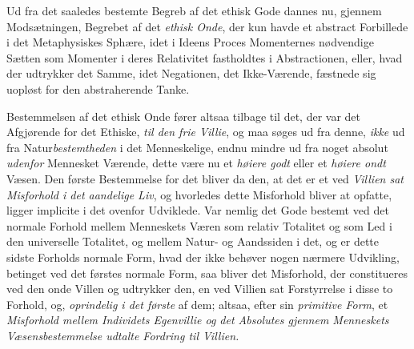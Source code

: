 Ud fra det saaledes bestemte Begreb af det ethisk Gode dannes nu, gjennem
Modsætningen, Begrebet af det \emph{ethisk Onde}, der kun havde et abstract
Forbillede i det Metaphysiskes Sphære, idet i Ideens Proces Momenternes
nødvendige Sætten som Momenter i deres Relativitet fastholdtes i Abstractionen,
eller, hvad der udtrykker det Samme, idet Negationen, det Ikke-Værende, fæstnede
sig uopløst for den abstraherende Tanke.

Bestemmelsen af det ethisk Onde fører altsaa tilbage til det, der var det
Afgjørende for det Ethiske, \emph{til den frie Villie}, og maa søges ud fra
denne, \emph{ikke} ud fra Natur\emph{bestemtheden} i det Menneskelige, endnu
mindre ud fra noget absolut \emph{udenfor} Mennesket Værende, dette være nu et
\emph{høiere godt} eller et \emph{høiere ondt} Væsen. Den første Bestemmelse for
det bliver da den, at det er et ved \emph{Villien sat Misforhold i det aandelige
Liv}, og hvorledes dette Misforhold bliver at opfatte, ligger implicite i det
ovenfor Udviklede. Var nemlig det Gode bestemt ved det normale Forhold mellem
Menneskets Væren som relativ Totalitet og som Led i den universelle Totalitet, og
mellem Natur- og Aandssiden i det, og er dette sidste Forholds normale Form,
 \setcounter{footnote}{0}%
hvad der ikke behøver nogen nærmere Udvikling, betinget ved det førstes normale
Form, saa bliver det Misforhold, der constitueres ved den onde Villen og
udtrykker den, en ved Villien sat Forstyrrelse i disse to Forhold, og,
\emph{oprindelig i det første} af dem; altsaa, efter sin \emph{primitive Form},
et \emph{Misforhold mellem Individets Egenvillie og det Absolutes gjennem
Menneskets Væsensbestemmelse udtalte Fordring til Villien.}

